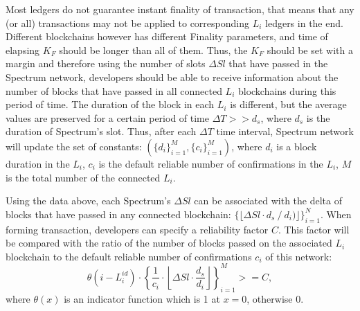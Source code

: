 Most ledgers do not guarantee instant finality of transaction, that means that any (or all) transactions may not be applied to corresponding $L_i$ ledgers in the end.
Different blockchains however has different Finality parameters, and time of elapsing $K_F$ should be longer than all of them.
Thus, the $K_F$ should be set with a margin and therefore using the number of slots $\Delta Sl$ that have passed in the Spectrum network, developers should be able to receive information about the number of blocks that have passed in all connected $L_i$ blockchains during this period of time.
The duration of the block in each $L_i$ is different, but the average values are preserved for a certain period of time ${\Delta T >> d_s}$, where $d_s$ is the duration of Spectrum's slot.
Thus, after each $\Delta T$ time interval, Spectrum network will update the set of constants: ${(\{d_{i}\}_{i=1}^{M},\{c_{i}\}_{i=1}^{M})}$, where $d_i$ is a block duration in the $L_i$, $c_i$ is the default reliable number of confirmations in the $L_i$, $M$ is the total number of the connected $L_i$.

Using the data above, each Spectrum's $\Delta Sl$ can be associated with the delta of blocks that have passed in any connected blockchain: ${\{\lfloor \Delta Sl \cdot d_s \mathbin{/} d_i)\rfloor\}_{i=1}^{N}}$.
When forming transaction, developers can specify a reliability factor $C$.
This factor will be compared with the ratio of the number of blocks passed on the associated $L_i$ blockchain to the default reliable number of confirmations $c_i$ of this network:
\begin{equation}
    \theta(i-L_i^{id})\cdot \left\{\frac{1}{c_i} \cdot \left\lfloor \Delta Sl \cdot \frac{d_s}{d_i}\right\rfloor\right\}_{i=1}^{M} >= C,\label{eq:equation2}
\end{equation}
where $\theta(x)$ is an indicator function which is 1 at $x = 0$, otherwise 0.

